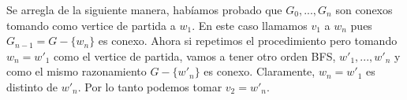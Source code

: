 \documentclass[a4paper]{article}
\begin{document}
\thispagestyle{empty}

\maketitle
\newpage

\thispagestyle{empty}
\vspace{3cm}
\tableofcontents
\newpage

Se arregla de la siguiente manera, habíamos probado que $G_{0},..., G_{n}$ son conexos tomando como vertice de partida a $w_{1}$. En este caso llamamos $v_{1}$ a $w_{n}$ pues $G_{n-1}=G-\{w_n\}$ es conexo.
Ahora si repetimos el procedimiento pero tomando $w_{n}=w'_{1}$ como el vertice de partida, vamos a tener otro orden BFS, $w'_{1},...,w'_{n}$ y como el mismo razonamiento $G - \{w'_n\}$ es conexo. Claramente, $w_{n}=w'_{1}$ es distinto de $w'_{n}$.
Por lo tanto podemos tomar $v_{2}=w'_{n}$.





\end{document}
